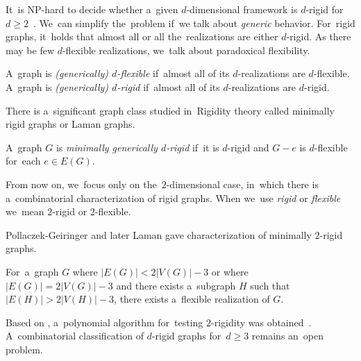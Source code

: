 It~is NP-hard to decide whether a~given \( d \)-dimensional framework is
\( d \)-rigid for~\( d \ge 2 \)~\cite{d_rigidity_hardness}.
We~can simplify the~problem if~we talk about \emph{generic} behavior.
%
For~rigid graphs, it~holds that almost all%
or all the~realizations are
either \( d \)-rigid.
As there may be few \( d \)-flexible realizations,
we~talk about paradoxical flexibility.
%
\begin{definition}
	A~graph is \emph{(generically) \( d \)-flexible} if~almost all of
	its \( d \)-realizations are \( d \)-flexible.
	A~graph is \emph{(generically) \( d \)-rigid} if~almost all of
	its \( d \)-realizations are \( d \)-rigid.
\end{definition}
%


There is a~significant graph class studied in~Rigidity theory
called minimally rigid graphs or Laman graphs.
%
\begin{definition}
	A~graph \( G \) is \emph{minimally generically \( d \)-rigid} if~it is \( d \)-rigid
	and \( G - e \) is \(d\)-flexible for~each \( e \in E(G) \).
\end{definition}
%
From now on, we~focus only on the~\( 2 \)-dimensional case,
in~which there is a~combinatorial characterization of rigid graphs.
When we~use \emph{rigid} or \emph{flexible} we~mean \( 2 \)-rigid or \( 2 \)-flexible.

Pollaczek-Geiringer and later Laman gave characterization of minimally $2$-rigid graphs.
%
%
\begin{corollary}
	For~a~graph \( G \) where \( |E(G)| < 2|V(G)| - 3 \) or
	where \( |E(G)| = 2|V(G)| - 3 \) and there exists a~subgraph \( H \) such that \( |E(H)| > 2|V(H)| - 3 \),
	there exists a~flexible realization of \( G \).
\end{corollary}
%
Based on ,
a~polynomial algorithm
for~testing $2$-rigidity was obtained~\cite{polynomial-min-rigid}.
A~combinatorial classification of $d$-rigid graphs
for~$d \geq 3$ remains an~open problem.

